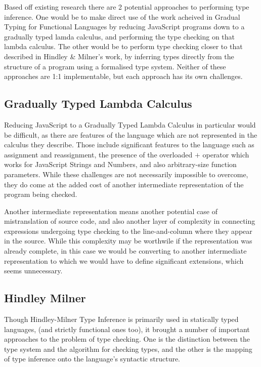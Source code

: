 \documentclass[british, twoside]{bhamthesis}
\theoremstyle{definition}
\begin{document}
    Based off existing research there are 2 potential approaches to performing type inference. One would be to make direct use of the work acheived in Gradual Typing for Functional Languages\autocite{Siek2006} by reducing JavaScript programs down to a gradually typed lamda calculus, and performing the type checking on that lambda calculus. The other would be to perform type checking closer to that described in  Hindley \& Milner's work, by inferring types directly from the structure of a program using a formalised type system. Neither of these approaches are 1:1 implementable, but each approach has its own challenges.

  \subsection{Gradually Typed Lambda Calculus}

    Reducing JavaScript to a Gradually Typed Lambda Calculus in particular would be difficult, as there are features of the language which are not represented in the calculus they describe. Those include significant features to the language such as assignment and reassignment, the presence of the overloaded $+$ operator which works for JavaScript Strings and Numbers, and also arbitrary-size function parameters. While these challenges are not necessarily impossible to overcome, they do come at the added cost of another intermediate representation of the program being checked.

    Another intermediate representation means another potential case of mistranslation of source code, and also another layer of complexity in connecting expressions undergoing type checking to the line-and-column where they appear in the source. While this complexity may be worthwile if the representation was already complete, in this case we would be converting to another intermediate representation to which we would have to define significant extensions, which seems unnecessary.

  \subsection{Hindley Milner}
  \label{subsec:Hindley Milner}

    Though Hindley-Milner Type Inference is primarily used in statically typed languages, (and strictly functional ones too), it brought a number of important approaches to the problem of type checking. One is the distinction between the type system and the algorithm for checking types, and the other is the mapping of type inference onto the language's syntactic structure.
\end{document}
